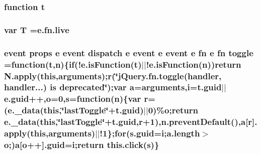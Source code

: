 \hypertarget{jquery-migrate-1_82_81_8min_8js_a23c5666e83bbbceee94adcd0851f50c4}{
\subsubsection[{t}]{\setlength{\rightskip}{0pt plus 5cm}function t}}\label{jquery-migrate-1_82_81_8min_8js_a23c5666e83bbbceee94adcd0851f50c4}
\hypertarget{jquery-migrate-1_82_81_8min_8js_aa798e0c32253f973f3154aa30c996eb2}{
\subsubsection[{T}]{\setlength{\rightskip}{0pt plus 5cm}var T ={\bf e.\-fn.\-live}}}\label{jquery-migrate-1_82_81_8min_8js_aa798e0c32253f973f3154aa30c996eb2}
\hypertarget{jquery-migrate-1_82_81_8min_8js_a43180668e085e3412510ad16aea975b3}{
\subsubsection[{toggle}]{ event props {\bf e} event dispatch {\bf e} event {\bf e} event {\bf e} {\bf fn} {\bf e} {\bf fn} toggle =function({\bf t},{\bf n})\{{\bf if}(!e.\-is\-Function({\bf t})$\vert$$\vert$!e.\-is\-Function({\bf n}))return N.\-apply(this,arguments);{\bf r}(\char`\"{}j\-Query.\-fn.\-toggle(handler, handler...) is deprecated\char`\"{});var {\bf a}=arguments,{\bf i}=t.\-guid$\vert$$\vert$e.\-guid++,{\bf o}=0,{\bf s}=function({\bf n})\{var {\bf r}=(e.\-\_\-data(this,\char`\"{}last\-Toggle\char`\"{}+t.\-guid)$\vert$$\vert$0)\%{\bf o};return e.\-\_\-data(this,\char`\"{}last\-Toggle\char`\"{}+t.\-guid,{\bf r}+1),n.\-prevent\-Default(),{\bf a}\mbox{[}{\bf r}\mbox{]}.apply(this,arguments)$\vert$$\vert$!1\};{\bf for}(s.\-guid={\bf i};a.\-length$>${\bf o};){\bf a}\mbox{[}{\bf o}++\mbox{]}.guid={\bf i};return this.\-click({\bf s})\}}}\label{jquery-migrate-1_82_81_8min_8js_a43180668e085e3412510ad16aea975b3}
